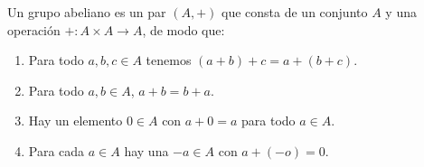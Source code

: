\begin{definition}
  Un grupo abeliano es un par $\left(A,+\right)$ que consta de un
  conjunto $A$ y una operación $+\colon A\times A\to A$, de modo que:
  \begin{enumerate}
    \item Para todo $a,b,c\in A$ tenemos $\left(a+b\right)+c=a+\left(b+c\right)$.
    \item Para todo $a,b\in A$, $a+b=b+a$.
    \item Hay un elemento $0\in A$ con $a+0=a$ para todo $a\in A$.
    \item Para cada $a\in A$ hay una $-a\in A$ con $a+\left(-o\right)=0$.
  \end{enumerate}
\end{definition}